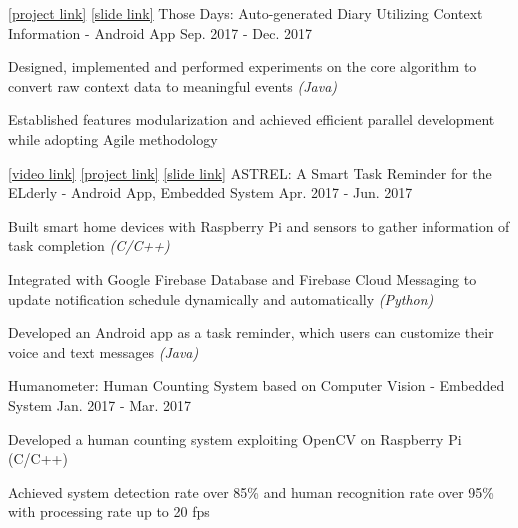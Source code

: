 \documentclass[13pt, a4paper]{awesome-cv}
\begin{document}
\begin{cventries}
    \cventry
        {
            \href{https://github.com/huang-chenyu/Those-Days}{[project link]}
            \href{https://www.slideshare.net/joannelovecat/those-days-86206667}{[slide link]}
        }
        {Those Days: Auto-generated Diary Utilizing Context Information - Android App}
        {}
        {Sep. 2017 - Dec. 2017}
        {
        \begin{cvitems}
            \item {Designed, implemented and performed experiments on the core algorithm to convert raw context data to meaningful events \textit{(Java)}}
            \item {Established features modularization and achieved efficient parallel development while adopting Agile methodology}
        \end{cvitems}
        }

    \cventry
        {
            \href{https://www.youtube.com/watch?v=3Wm0Gn6tPUo}{[video link]}
            \href{https://github.com/joannewolf/ASTREL}{[project link]}
            \href{https://www.slideshare.net/joannelovecat/astrel-a-smart-task-reminder-for-elderly}{[slide link]}
        }
        {ASTREL: A Smart Task Reminder for the ELderly - Android App, Embedded System}
        {}
        {Apr. 2017 - Jun. 2017}
        {
        \begin{cvitems}
            \item {Built smart home devices with Raspberry Pi and sensors to gather information of task completion \textit{(C/C++)}}
            \item {Integrated with Google Firebase Database and Firebase Cloud Messaging to update notification schedule dynamically and automatically \textit{(Python)}}
            \item {Developed an Android app as a task reminder, which users can customize their voice and text messages \textit{(Java)}}
        \end{cvitems}
        }

    \cventry
        {}
        {Humanometer: Human Counting System based on Computer Vision - Embedded System}
        {}
        {Jan. 2017 - Mar. 2017}
        {
        \begin{cvitems}
            \item {Developed a human counting system exploiting OpenCV on Raspberry Pi (C/C++)}
            \item {Achieved system detection rate over 85\% and human recognition rate over 95\% with processing rate up to 20 fps}
        \end{cvitems}
        }


\end{cventries}
\end{document}
